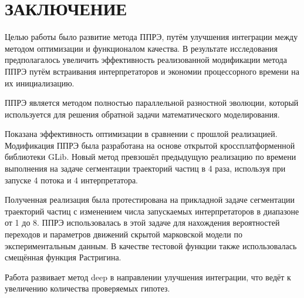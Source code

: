 \chapter*{ЗАКЛЮЧЕНИЕ}

Целью работы было развитие метода ППРЭ,
путём улучшения интеграции
между методом оптимизации
и функционалом качества.
В результате исследования
предполагалось увеличить
эффективность реализованной
модификации метода ППРЭ
путём встраивания интерпретаторов
и экономии процессорного времени
на их инициализацию.

ППРЭ является методом
полностью параллельной разностной эволюции,
который используется для решения
обратной задачи математического моделирования.

Показана эффективность
оптимизации в сравнении с
прошлой реализацией.
Модификация ППРЭ
была разработана на основе
открытой кроссплатформенной
библиотеки GLib.
Новый метод
превзошёл предыдущую реализацию
по времени выполнения на задаче
сегментации траекторий частиц
в 4 раза, используя при запуске
4 потока и 4 интерпретатора.

Полученная реализация
была протестирована на
прикладной задаче
сегментации траекторий частиц
с изменением числа запускаемых
интерпретаторов в диапазоне
от 1 до 8.
ППРЭ использовалась в этой задаче
для нахождения вероятностей переходов и
параметров движений
скрытой марковской модели по
экспериментальным данным.
В качестве тестовой функции
также использовалась
смещённая функция Растригина.

Работа развивает метод deep
в направлении улучшения интеграции,
что ведёт к увеличению количества
проверяемых гипотез.

